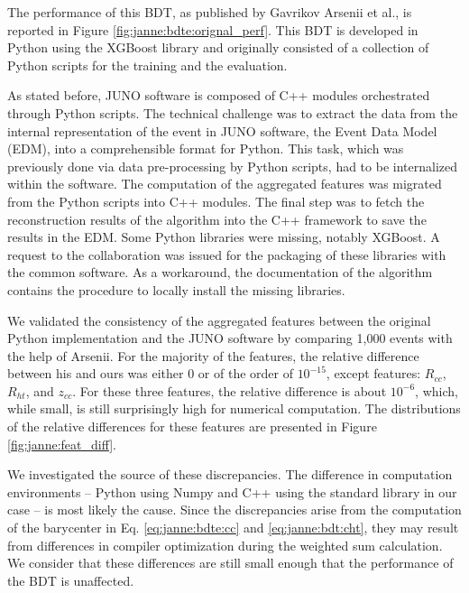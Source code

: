 \documentclass[../main.tex]{subfiles}
\begin{document}
The performance of this BDT, as published by Gavrikov Arsenii et al., is reported in Figure \ref{fig:janne:bdte:orignal_perf}. This BDT is developed in Python using the XGBoost \cite{chen_xgboost_2016} library and originally consisted of a collection of Python scripts for the training and the evaluation.

As stated before, JUNO software is composed of C++ modules orchestrated through Python scripts. The technical challenge was to extract the data from the internal representation of the event in JUNO software, the Event Data Model (EDM), into a comprehensible format for Python. This task, which was previously done via data pre-processing by Python scripts, had to be internalized within the software. The computation of the aggregated features was migrated from the Python scripts into C++ modules. The final step was to fetch the reconstruction results of the algorithm into the C++ framework to save the results in the EDM. Some Python libraries were missing, notably XGBoost. A request to the collaboration was issued for the packaging of these libraries with the common software. As a workaround, the documentation of the algorithm contains the procedure to locally install the missing libraries.

We validated the consistency of the aggregated features between the original Python implementation and the JUNO software by comparing 1,000 events with the help of Arsenii. For the majority of the features, the relative difference between his and ours was either 0 or of the order of $10^{-15}$, except features: $R_{cc}$, $R_{ht}$, and $z_{cc}$. For these three features, the relative difference is about $10^{-6}$, which, while small, is still surprisingly high for numerical computation. The distributions of the relative differences for these features are presented in Figure \ref{fig:janne:feat_diff}.

We investigated the source of these discrepancies. The difference in computation environments -- Python using Numpy \cite{harris_array_2020} and C++ using the standard library in our case -- is most likely the cause. Since the discrepancies arise from the computation of the barycenter in Eq. \ref{eq:janne:bdte:cc} and \ref{eq:janne:bdt:cht}, they may result from differences in compiler optimization during the weighted sum calculation. We consider that these differences are still small enough that the performance of the BDT is unaffected.
\end{document}
